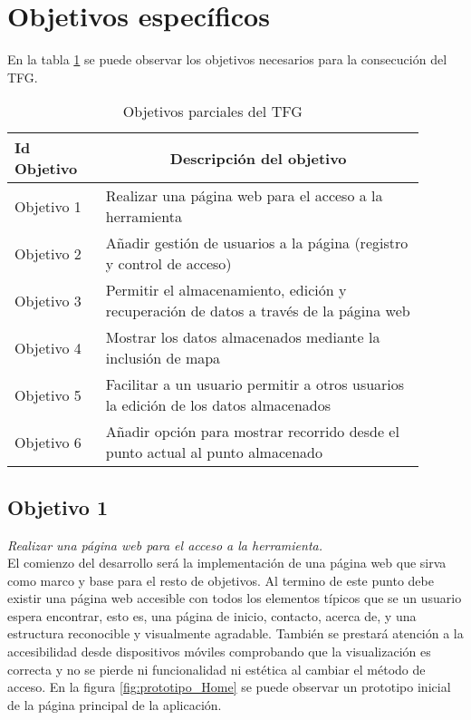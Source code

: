 \section{Objetivos específicos}

En la tabla \ref{tab:objetivos} se puede observar los objetivos necesarios para la consecución del \ac{TFG}.

\begin{table}[hp]
  \centering 
  \begin{tabular}{p{0.2\linewidth}p{0.7\linewidth}}
    \multicolumn{1}{l}{\cellcolor{black!30}\textbf{Id Objetivo}} & 
 	\multicolumn{1}{c}{\cellcolor{black!30}\textbf{Descripción del objetivo}}\\
    \toprule
    Objetivo 1 & Realizar una página web para el acceso a la herramienta \\
	Objetivo 2 & Añadir gestión de usuarios a la página (registro y control de acceso) \\
	Objetivo 3 & Permitir el almacenamiento, edición y recuperación de datos a través de la página web \\
	Objetivo 4 & Mostrar los datos almacenados mediante la inclusión de mapa \\
	Objetivo 5 & Facilitar a un usuario permitir a otros usuarios la edición de los datos almacenados \\
	Objetivo 6 & Añadir opción para mostrar recorrido desde el punto actual al punto almacenado \\
    \hline
  \end{tabular}
  \caption{Objetivos parciales del \ac{TFG}}
  \label{tab:objetivos}
\end{table}


\subsection{Objetivo 1}
\emph{Realizar una página web para el acceso a la herramienta.}\\
El comienzo del desarrollo será la implementación de una página web que sirva como marco y base para el resto de objetivos. Al termino de este punto debe existir una página web accesible con todos los elementos típicos que se un usuario espera encontrar, esto es, una página de inicio, contacto, acerca de, y una estructura reconocible y visualmente agradable. También se prestará atención a la accesibilidad desde dispositivos móviles comprobando que la visualización es correcta y no se pierde ni funcionalidad ni estética al cambiar el método de acceso. En la figura \ref{fig:prototipo_Home} se puede observar un prototipo inicial de la página principal de la aplicación.

